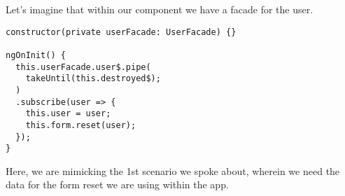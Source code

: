 Let's imagine that within our component we have a facade for the user.
\begin{lstlisting}
constructor(private userFacade: UserFacade) {}

ngOnInit() {
  this.userFacade.user$.pipe(
    takeUntil(this.destroyed$);
  )
  .subscribe(user => {
    this.user = user;
    this.form.reset(user);
  });
}
\end{lstlisting}

Here, we are mimicking the 1st scenario we spoke about, wherein we need the data
for the form reset we are using within the app.
